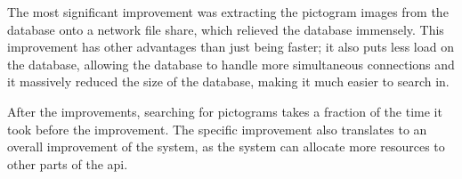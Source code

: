 The most significant improvement was extracting the pictogram images from the database onto a network file share, which relieved the database immensely. This improvement has other advantages than just being faster; it also puts less load on the database, allowing the database to handle more simultaneous connections and it massively reduced the size of the database, making it much easier to search in.

After the improvements, searching for pictograms takes a fraction of the time it took before the improvement. The specific improvement also translates to an overall improvement of the system, as the system can allocate more resources to other parts of the \gls{api}.